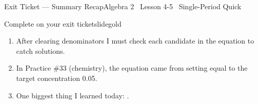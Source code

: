 \documentclass[aspectratio=169, 11pt]{beamer}
\begin{document}
\begin{frame}{Exit Ticket --- Summary Recap}{Algebra 2 \textperiodcentered\ Lesson 4-5 \textperiodcentered\ Single-Period Quick}
\vspace{0.2cm}
\begin{projcard}{Complete on your exit ticket}{slidegold}
\begin{enumerate}
  \setlength{\itemsep}{0.25cm}
  \item After clearing denominators I must check each candidate in the \underline{\hspace{1.2cm}} equation to catch \underline{\hspace{1.2cm}} solutions.
  \item In Practice \#33 (chemistry), the equation came from setting \underline{\hspace{2.2cm}} equal to the target concentration 0.05.
  \item One biggest thing I learned today: \underline{\hspace{4cm}}.
\end{enumerate}
\end{projcard}
\end{frame}
\end{document}
